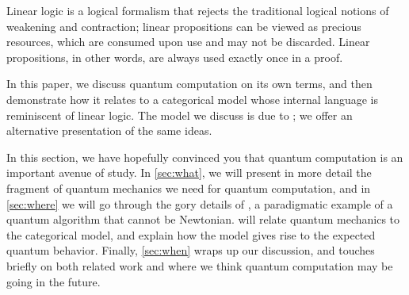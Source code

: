 Linear logic is a logical formalism that rejects the traditional logical
notions of weakening and contraction; linear propositions can be viewed as
precious resources, which are consumed upon use and may not be discarded.
Linear propositions, in other words, are always used exactly once in a proof.

In this paper, we discuss quantum computation on its own terms, and then
demonstrate how it relates to a categorical model whose internal language is
reminiscent of linear logic.  The model we discuss is due to \citet{abramsky2009categorical};
we offer an alternative presentation of the same ideas.

In this section, we have hopefully convinced you that quantum computation is an
important avenue of study.  In \cref{sec:what}, we will present in more detail
the fragment of quantum mechanics we need for quantum computation, and in
\cref{sec:where} we will go through the gory details of , a paradigmatic example of a quantum algorithm that cannot be
Newtonian.   will relate quantum mechanics to the categorical model,
and explain how the model gives rise to the expected quantum behavior.  Finally,
\cref{sec:when} wraps up our discussion, and touches briefly on both related
work and where we think quantum computation may be going in the future.
